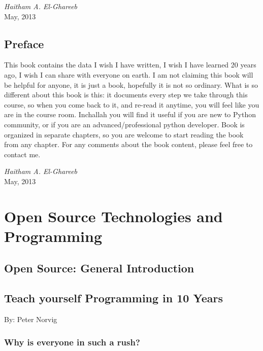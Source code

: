 \documentclass[12pt,a4paper,final,twoside,onecolumn,titlepage]{book}
\begin{document}
\thispagestyle{empty}

\begin{flushright}
\textit{Haitham A. El-Ghareeb} \\
May, 2013
\end{flushright}

\cleardoublepage
{}
\tableofcontents

\chapter{Preface}
This book contains the data I wish I have written, I wish I have learned 20 years ago, I wish I can share with everyone on earth. I am not claiming this book will be helpful for anyone, it is just a book, hopefully it is not so ordinary. What is so different about this book is this: it documents every step we take through this course, so when you come back to it, and re-read it anytime, you will feel like you are in the course room. Inchallah you will find it useful if you are new to Python community, or if you are an advanced/professional python developer. Book is organized in separate chapters, so you are welcome to start reading the book from any chapter. For any comments about the book content, please feel free to contact me.
\begin{flushright}
\textit{Haitham A. El-Ghareeb} \\
May, 2013
\end{flushright}

\mainmatter

\part{Open Source Technologies and Programming}

\chapter{Open Source: General Introduction}


\chapter{Teach yourself Programming in 10 Years}

By: Peter Norvig

\section{Why is everyone in such a rush?}
\end{document}
